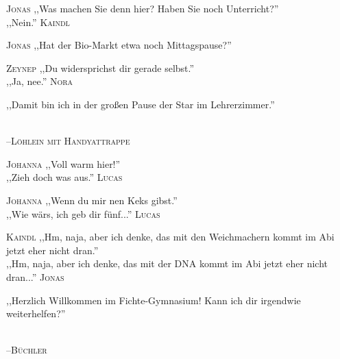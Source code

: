 \vspace{3mm}
\hangindent=0.7cm
\raggedright \textsc{\footnotesize Jonas} ,,Was machen Sie denn hier? Haben Sie noch Unterricht?''\\
\raggedleft ,,Nein.'' \textsc{\footnotesize Kaindl}\\
\hangindent=0.7cm
\raggedright \textsc{\footnotesize Jonas} ,,Hat der Bio-Markt etwa noch Mittagspause?''\\

\vspace{3mm}
\hangindent=0.7cm
\raggedright \textsc{\footnotesize Zeynep} ,,Du widersprichst dir gerade selbst.''\\
\raggedleft ,,Ja, nee.'' \textsc{\footnotesize Nora}\\

\vspace{3mm}
{\raggedright ,,Damit bin ich in der großen Pause der Star im Lehrerzimmer.''}\\
\raggedleft \textsc{\footnotesize --\/Löhlein mit Handyattrappe}\\

\vspace{3mm}
\hangindent=0.7cm
\raggedright \textsc{\footnotesize Johanna} ,,Voll warm hier!''\\
\raggedleft ,,Zieh doch was aus.'' \textsc{\footnotesize Lucas}\\
\hangindent=0.7cm
\raggedright \textsc{\footnotesize Johanna} ,,Wenn du mir nen Keks gibst.''\\
\raggedleft ,,Wie wärs, ich geb dir fünf...'' \textsc{\footnotesize Lucas}\\

\vspace{3mm}
\hangindent=0.7cm
\raggedright \textsc{\footnotesize Kaindl} ,,Hm, naja, aber ich denke, das mit den Weichmachern kommt im Abi jetzt eher nicht dran.''\\
\raggedleft ,,Hm, naja, aber ich denke, das mit der DNA kommt im Abi jetzt eher nicht dran...'' \textsc{\footnotesize Jonas}\\

\vspace{3mm}
{\raggedright ,,Herzlich Willkommen im Fichte-Gymnasium! Kann ich dir irgendwie weiterhelfen?''}\\
\raggedleft \textsc{\footnotesize --\/Büchler}\\

